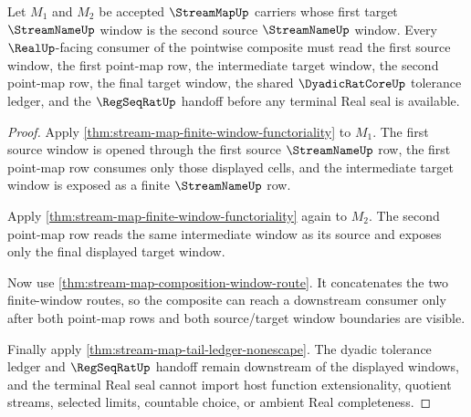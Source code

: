 \begin{theorem}
\label{thm:stream-map-pointwise-composition}
Let $M_1$ and $M_2$ be accepted $\StreamMapUp$ carriers whose first target $\StreamNameUp$ window is the second source $\StreamNameUp$ window. Every $\RealUp$-facing consumer of the pointwise composite must read the first source window, the first point-map row, the intermediate target window, the second point-map row, the final target window, the shared $\DyadicRatCoreUp$ tolerance ledger, and the $\RegSeqRatUp$ handoff before any terminal Real seal is available.
\end{theorem}
\begin{proof}
Apply \autoref{thm:stream-map-finite-window-functoriality} to $M_1$. The first source window is opened through the first source $\StreamNameUp$ row, the first point-map row consumes only those displayed cells, and the intermediate target window is exposed as a finite $\StreamNameUp$ row.

Apply \autoref{thm:stream-map-finite-window-functoriality} again to $M_2$. The second point-map row reads the same intermediate window as its source and exposes only the final displayed target window.

Now use \autoref{thm:stream-map-composition-window-route}. It concatenates the two finite-window routes, so the composite can reach a downstream consumer only after both point-map rows and both source/target window boundaries are visible.

Finally apply \autoref{thm:stream-map-tail-ledger-nonescape}. The dyadic tolerance ledger and $\RegSeqRatUp$ handoff remain downstream of the displayed windows, and the terminal Real seal cannot import host function extensionality, quotient streams, selected limits, countable choice, or ambient Real completeness.
\end{proof}


